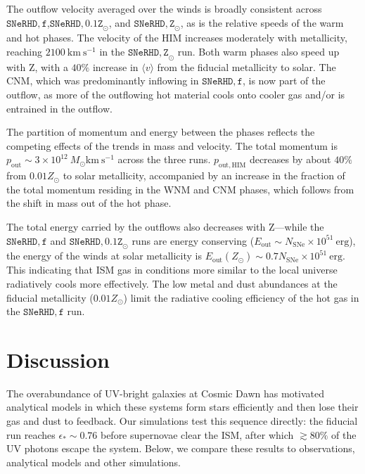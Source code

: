 \documentclass[twocolumn,linenumbers]{aastex631}
\begin{document}
The outflow velocity averaged over the winds is broadly consistent across $\mathtt{SNeRHD,f}$,$\mathtt{SNeRHD,0.1Z}_\odot$, and $\mathtt{SNeRHD,Z}_\odot$, as is the relative speeds of the warm and hot phases. The velocity of the HIM increases moderately with metallicity, reaching $2100\ \mathrm{km\ s^{-1}}$ in the $\mathtt{SNeRHD,Z}_\odot$ run. Both warm phases also speed up with Z, with a $40\%$ increase in $\langle v \rangle$ from the fiducial metallicity to solar. The CNM, which was predominantly inflowing in $\mathtt{SNeRHD,f}$, is now part of the outflow, as more of the outflowing hot material cools onto cooler gas and/or is entrained in the outflow. 

The partition of momentum and energy between the phases reflects the competing effects of the trends in mass and velocity. The total momentum is $p_\mathrm{out} \sim 3\times10^{12}\ M_\odot \mathrm{km\ s^{-1}}$ across the three runs. $p_\mathrm{out,HIM}$ decreases by about $40\%$ from $0.01Z_\odot$ to solar metallicity, accompanied by an increase in the fraction of the total momentum residing in the WNM and CNM phases, which follows from the shift in mass out of the hot phase. 

The total energy carried by the outflows also decreases with Z---while the $\mathtt{SNeRHD,f}$ and $\mathtt{SNeRHD,0.1Z}_\odot$ runs are energy conserving ($E_\mathrm{out}\sim N_\mathrm{SNe} \times 10^{51}\ \mathrm{erg}$), the energy of the winds at solar metallicity is $E_\mathrm{out}(Z_\odot) \sim 0.7 N_\mathrm{SNe} \times 10^{51}\ \mathrm{erg}$. This indicating that ISM gas in conditions more similar to the local universe radiatively cools more effectively. The low metal and dust abundances at the fiducial metallicity ($0.01Z_\odot$) limit the radiative cooling efficiency of the hot gas in the $\mathtt{SNeRHD,f}$ run.




\section{Discussion}
The overabundance of UV-bright galaxies at Cosmic Dawn has motivated analytical models in which these systems form stars efficiently and then lose their gas and dust to feedback. Our simulations test this sequence directly: the fiducial run reaches $\epsilon_* \sim 0.76$ before supernovae clear the ISM, after which $\gtrsim 80\%$ of the UV photons escape the system. Below, we compare these results to observations, analytical models and other simulations.
\end{document}
